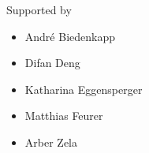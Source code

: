\begin{frame}[c]{Supported by}


\begin{itemize}
	\item Andr\'e Biedenkapp
	\item Difan Deng
	\item Katharina Eggensperger
	\item Matthias Feurer
	\item Arber Zela
\end{itemize}

%
%	
%
%	
%    	
%	
%	
%    
%


\end{frame}


